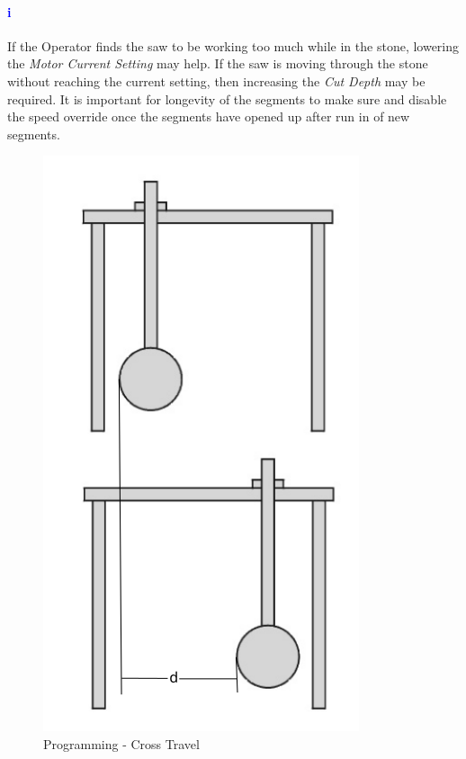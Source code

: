 \paragraph{\textbf{\LARGE \textcolor{blue}{i}}}If the Operator finds the saw to be working too much while in the stone, lowering the \textit{Motor Current Setting} may help. If the saw is moving through the stone without reaching the current setting, then increasing the \textit{Cut Depth} may be required. It is important for longevity of the segments to make sure and disable the speed override once the segments have opened up after run in of new segments.
\begin{figure}
	\centering
	\includegraphics[width=0.5\linewidth]{screen-captures/program/kodiak-saw-crosst-travel}
	\caption{Programming - Cross Travel}
	\label{fig:prg-cross-travel}
\end{figure}
\pagebreak
